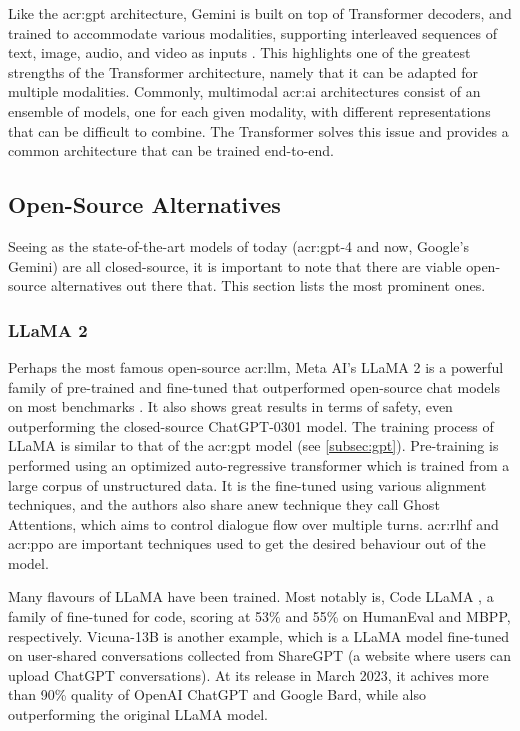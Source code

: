 Like the \acrshort{acr:gpt} architecture, Gemini is built on top of Transformer decoders, and trained to accommodate various modalities, supporting interleaved sequences of text, image, audio, and video as inputs \citep[3-4]{geminiteamGeminiFamilyHighly2023}. This highlights one of the greatest strengths of the Transformer architecture, namely that it can be adapted for multiple modalities. Commonly, multimodal \acrshort{acr:ai} architectures consist of an ensemble of models, one for each given modality, with different representations that can be difficult to combine. The Transformer solves this issue and provides a common architecture that can be trained end-to-end.

\subsection{Open-Source Alternatives}

Seeing as the state-of-the-art models of today (\acrshort{acr:gpt}-4 and now, Google's Gemini) are all closed-source, it is important to note that there are viable open-source alternatives out there that. This section lists the most prominent ones.

\subsubsection{LLaMA 2}

Perhaps the most famous open-source \acrshort{acr:llm}, Meta AI's LLaMA 2 is a powerful family of pre-trained and fine-tuned  that outperformed open-source chat models on most benchmarks \cite{touvronLlamaOpenFoundation2023a}. It also shows great results in terms of safety, even outperforming the closed-source ChatGPT-0301 model. The training process of LLaMA is similar to that of the \acrshort{acr:gpt} model (see \autoref{subsec:gpt}). Pre-training is performed using an optimized auto-regressive transformer which is trained from a large corpus of unstructured data. It is the fine-tuned using  various alignment techniques, and the authors also share anew technique they call Ghost Attentions, which aims to control dialogue flow over multiple turns. \gls{acr:rlhf} and \acrfull{acr:ppo} are important techniques used to get the desired behaviour out of the model.

Many flavours of LLaMA have been trained. Most notably is, Code LLaMA \citep{roziereCodeLlamaOpen2023}, a family of  fine-tuned for code, scoring at 53\% and 55\% on HumanEval and MBPP, respectively. Vicuna-13B is another example, which is a LLaMA model fine-tuned on user-shared conversations collected from ShareGPT (a website where users can upload ChatGPT conversations). At its release in March 2023, it achives more than 90\% quality of OpenAI ChatGPT and Google Bard, while also outperforming the original LLaMA model.

